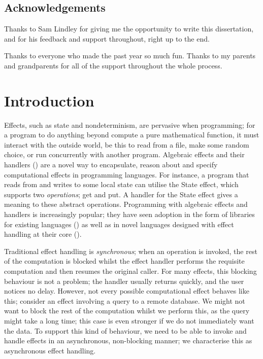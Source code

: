 \documentclass[msc,deptreport,cs]{infthesis} %
\begin{document}
\begin{preliminary}
\section*{Acknowledgements}
Thanks to Sam Lindley for giving me the opportunity to write this dissertation,
and for his feedback and support throughout, right up to the end.

Thanks to everyone who made the past year so much fun. Thanks to my parents and grandparents for all of the support throughout the whole process.



\tableofcontents

\end{preliminary}

\chapter{Introduction}

Effects, such as state and nondeterminism, are pervasive when programming; for a
program to do anything beyond compute a pure mathematical function, it must
interact with the outside world, be this to read from a file, make some random
choice, or run concurrently with another program. Algebraic effects and their
handlers (\cite{plotkin2003algebraic, plotkin2013handling}) are a novel way to
encapsulate, reason about and specify computational effects in programming
languages. For instance, a program that reads from and writes to some local
state can utilise the \textsf{State} effect, which supports two
\emph{operations}; \textsf{get} and \textsf{put}. A handler for the
\textsf{State} effect gives a meaning to these abstract operations. Programming
with algebraic effects and handlers is increasingly popular; they have seen
adoption in the form of libraries for existing languages
(\cite{kammar2013handlers, kiselyov2013extensible, brady2013programming}) as
well as in novel languages designed with effect handling at their core
(\cite{bauer2015programming, leijen2017type, convent2020doo}).

Traditional effect handling is \emph{synchronous}; when an operation is invoked,
the rest of the computation is blocked whilst the effect handler performs the
requisite computation and then resumes the original caller.
%
For many effects, this blocking behaviour is not a problem; the handler usually
returns quickly, and the user notices no delay. However, not every possible
computational effect behaves like this; consider an effect involving a query to
a remote database. We might not want to block the rest of the computation whilst
we perform this, as the query might take a long time; this case is even stronger
if we do not immediately want the data. To support this kind of behaviour, we
need to be able to invoke and handle effects in an asynchronous, non-blocking
manner; we characterise this as asynchronous effect handling.
\end{document}

